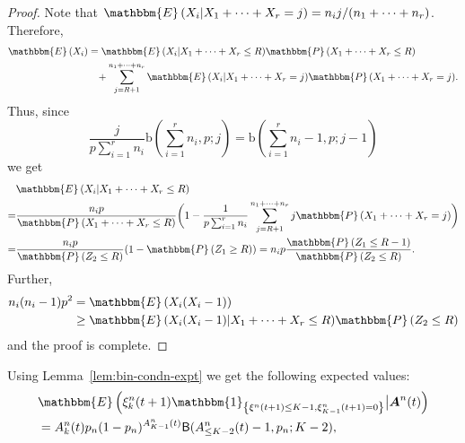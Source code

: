 \documentclass[11pt,a4paper, reqno]{article}
\begin{document}
\begin{proof}
 Note that ${\mathbbm{E}\left({X_i|X_1+\dots+X_r=j}\right)}=n_ij/(n_1+\dots+n_r)$. Therefore,
 \begin{equation}
  \begin{split}
   {\mathbbm{E}\left({X_i}\right)}&={\mathbbm{E}\left({X_i|X_1+\dots+X_r\leq R}\right)}{\mathbbm{P}\left({X_1+\dots+X_r\leq R}\right)}\\
   &\hspace{.3cm}+\sum_{j=R+1}^{n_1+\dots+n_r}{\mathbbm{E}\left({X_i|X_1+\dots+X_r=j}\right)}{\mathbbm{P}\left({X_1+\dots+X_r=j}\right)}.
  \end{split}
 \end{equation}Thus, since 
 \begin{equation}
 \frac{j}{p\sum_{i=1}^rn_i}\mathrm{b}\left(\sum_{i=1}^rn_i,p;j\right)= \mathrm{b}\left(\sum_{i=1}^rn_i-1,p;j-1\right)
 \end{equation}
 we get
 \begin{equation}
  \begin{split}
   &{\mathbbm{E}\left({X_i|X_1+\dots+X_r\leq R}\right)}\\
   =&\frac{n_ip}{{\mathbbm{P}\left({X_1+\dots+X_r\leq R}\right)}}\bigg(1-\frac{1}{p\sum_{i=1}^rn_i}\sum_{j=R+1}^{n_1+\dots+n_r}j {\mathbbm{P}\left({X_1+\dots+X_r=j}\right)}\bigg)\\
   =&\frac{n_ip}{{\mathbbm{P}\left({Z_2\leq R}\right)}}(1-{\mathbbm{P}\left({Z_1\geq R}\right)})=n_ip\frac{{\mathbbm{P}\left({Z_1\leq R-1}\right)}}{{\mathbbm{P}\left({Z_2\leq R}\right)}}.
  \end{split}
 \end{equation}
Further,
 \begin{equation}
 \begin{split}
  n_i(n_i-1)p^2&={\mathbbm{E}\left({X_i(X_i-1)}\right)}\\
  &\geq {\mathbbm{E}\left({X_i(X_i-1)|X_1+\dots+X_r\leq R}\right)}{\mathbbm{P}\left({Z_2\leq R}\right)}
  \end{split}
 \end{equation}
 and the proof is complete.
\end{proof}
Using Lemma~\ref{lem:bin-condn-expt} we get the following expected values:
\begin{equation}
 \begin{split}
  &{\mathbbm{E}\left({\xi_k^n(t+1){\ensuremath{\mathbbm{1}_{\left\{{\xi^n(t+1) \leq K-1, \xi^n_{{\scriptscriptstyle} K-1}(t+1)=0}\right\}}}}\big\vert {\ensuremath{\boldsymbol{{A}}}}^n(t)}\right)}\\
  &=A_k^n(t)p_n(1-p_n)^{A_{K-1}^n(t)}\mathsf{B}(A_{{\scriptscriptstyle} \leq K-2}^n(t)-1,p_n; K-2),
 \end{split}
\end{equation}
\end{document}
